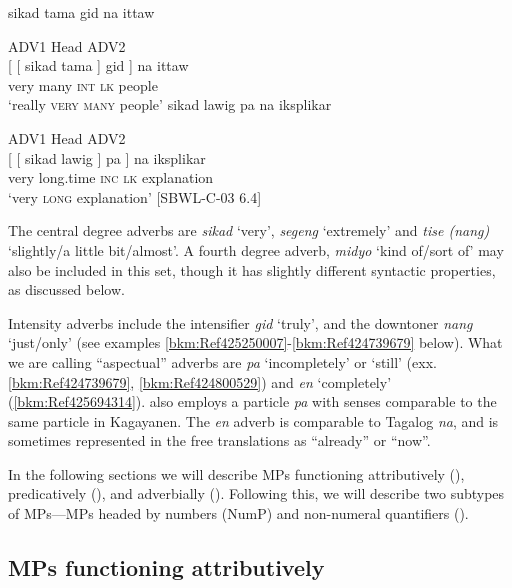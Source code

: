 \ea
  \label{bkm:Ref439938209}
sikad  tama   gid   na  ittaw \\\smallskip

  ADV1  Head  ADV2 \\
\gll {}[ [ sikad  tama ]  gid  ] na  ittaw \\
     {} {} very  many {} \textsc{int} {} \textsc{lk}  people \\
\glt ‘really \textsc{very many} people’
\z
\ea
\label{bkm:Ref425605536}
sikad  lawig      pa  na  iksplikar \\\smallskip

ADV1  Head      ADV2 \\
\gll {}[ [ sikad  lawig    ]   pa ]  na  iksplikar \\
  {} {}   very  long.time {} \textsc{inc} {} \textsc{lk}  explanation \\
\glt ‘very \textsc{long} explanation’ [SBWL-C-03 6.4]
\z

The central degree adverbs are \textit{sikad} ‘very’, \textit{segeng} ‘extremely’ and \textit{tise (nang)} ‘slightly/a little bit/almost’. A fourth degree adverb, \textit{midyo} ‘kind of/sort of’ may also be included in this set, though it has slightly different syntactic properties, as discussed below.

Intensity adverbs include the intensifier \textit{gid} ‘truly’, and the downtoner \textit{nang} ‘just/only’ (see examples \ref{bkm:Ref425250007}{}-\ref{bkm:Ref424739679} below). What we are calling “aspectual” adverbs are \textit{pa} ‘incompletely’ or ‘still’ (exx. \ref{bkm:Ref424739679}, \ref{bkm:Ref424800529}) and \textit{en} ‘completely’ (\ref{bkm:Ref425694314}).  also employs a particle \textit{pa} with senses comparable to the same particle in Kagayanen. The \textit{en} adverb is comparable to Tagalog \textit{na}, and is sometimes represented in the free translations as “already” or “now”.

\hspace*{-1.3pt}In the following sections we will describe MPs functioning attributively (), predicatively (), and adverbially ().  Following this, we will describe two subtypes of MPs---MPs headed by numbers (NumP) and non-numeral quantifiers ().
 

\subsection{MPs functioning attributively}
\label{bkm:Ref424719800}\label{sec:attributivemps} 

